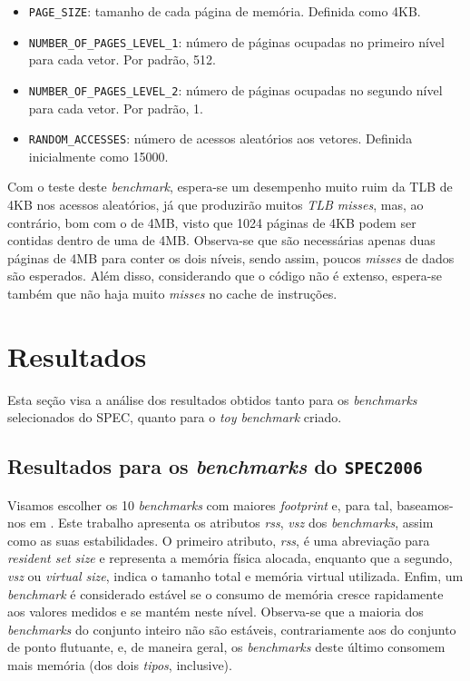 \documentclass[12pt]{article}
\begin{document}
\begin {itemize}
\item  \texttt{PAGE\_SIZE}: tamanho de cada página de memória. Definida como
4KB.
\item  \texttt{NUMBER\_OF\_PAGES\_LEVEL\_1}: número de páginas ocupadas no
primeiro nível para cada vetor. Por padrão, 512.
\item  \texttt{NUMBER\_OF\_PAGES\_LEVEL\_2}: número de páginas ocupadas no
segundo nível para cada vetor. Por padrão, 1.
\item  \texttt{RANDOM\_ACCESSES}: número de acessos aleatórios aos vetores.
Definida inicialmente como 15000.
\end{itemize}

Com o teste deste \textit{benchmark}, espera-se um desempenho muito ruim da
TLB de 4KB nos acessos aleatórios, já que produzirão muitos \textit{TLB misses},
mas, ao contrário, bom com o de 4MB, visto que 1024 páginas de 4KB podem ser
contidas dentro de uma de 4MB. Observa-se que são necessárias apenas duas
páginas de 4MB para conter os dois níveis, sendo assim, poucos \textit{misses}
de dados são esperados. Além disso, considerando que o código não é extenso,
espera-se também que não haja muito \textit{misses} no cache de instruções.

\section {Resultados}

Esta seção visa a análise dos resultados obtidos tanto para os
\textit{benchmarks} selecionados do SPEC, quanto para o \textit{toy benchmark}
criado.

\subsection{Resultados para os \textit{benchmarks} do \texttt{SPEC2006}}

Visamos escolher os 10 \textit{benchmarks} com maiores \textit{footprint} e,
para tal, baseamos-nos em \cite{Henning:07}. Este trabalho apresenta os
atributos \textit{rss}, \textit{vsz} dos \textit{benchmarks}, assim como as suas
estabilidades. O primeiro atributo, \textit{rss}, é uma abreviação para
\textit{resident set size} e representa a memória física alocada, enquanto que a
segundo, \textit{vsz} ou \textit{virtual size}, indica o tamanho total e memória
virtual utilizada. Enfim, um \textit{benchmark} é considerado estável se o
consumo de memória cresce rapidamente aos valores medidos e se mantém neste
nível. %
Observa-se que a maioria dos \textit{benchmarks} do conjunto inteiro não são
estáveis, contrariamente aos do conjunto de ponto flutuante, e, de maneira
geral, os \textit{benchmarks} deste último consomem mais memória (dos dois
\textit{tipos}, inclusive).
\end{document}
